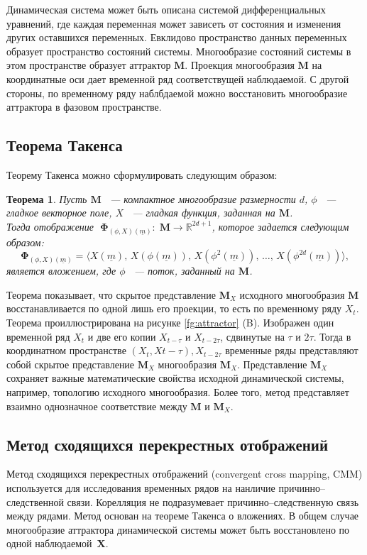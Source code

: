 \documentclass[12pt]{extarticle}
\newtheorem{theorem}{Теорема}
\newcommand{\bbr}{\mathbb{R}}
\begin{document}
Динамическая система может быть описана системой дифференциальных уравнений, где каждая переменная может зависеть от состояния и изменения других оставшихся переменных. Евклидово пространство данных переменных образует пространство состояний системы. Многообразие состояний системы в этом пространстве образует аттрактор $\mathbf{M}$. Проекция многообразия $\mathbf{M}$ на координатные оси дает временной ряд соответствущей наблюдаемой. С другой стороны, по временному ряду наблбдаемой можно восстановить многообразие аттрактора в фазовом пространстве.

\subsection{Теорема Такенса}
Теорему Такенса можно сформулировать следующим образом:
\begin{theorem}
Пусть $\mathbf{M}$ ~--- компактное многообразие размерности $d$, $\phi$ ~--- гладкое векторное поле, $X$ ~--- гладкая функция, заданная на $\mathbf{M}$.\\
Тогда отображение $\;\mathbf{\Phi}_{(\phi,X)(\underline{m})}:\; \mathbf{M} \rightarrow \bbr^{2d+1}$, которое задается следующим образом:
\[ \mathbf{\Phi}_{(\phi,X)(\underline{m})} = \langle X(\underline{m}),\,X(\phi(\underline{m})),\,X(\phi^2(\underline{m})),\,\dots,\, X(\phi^{2d}(\underline{m}))\rangle,\]
является вложением, где $\phi$ ~--- поток, заданный на $\mathbf{M}$.
\label{Taken's theorem}
\end{theorem}
Теорема показывает, что скрытое представление $\mathbf{M}_X$ исходного многообразия $\mathbf{M}$ восстанавливается по одной лишь его проекции, то есть по временному ряду $X_t$. Теорема проиллюстрирована на рисунке \ref{fg:attractor} (B). Изображен один временной ряд $X_t$ и две его копии $X_{t-\tau}$ и $X_{t-2\tau}$, сдвинутые на $\tau$ и $2\tau$. Тогда в координатном пространстве $(X_{t},X{t-\tau}),X_{t-2\tau}$ временные ряды представляют собой скрытое представление $\mathbf{M}_X$ многообразия $\mathbf{M}_X$. Представление $\mathbf{M}_X$ сохраняет важные математические свойства исходной динамической системы, например, топологию исходного многообразия. Более того, метод представляет взаимно однозначное соответствие между $\mathbf{M}$ и $\mathbf{M}_X$.


\subsection{Метод сходящихся перекрестных отображений}
Метод сходящихся перекрестных отображений (convergent cross mapping, CMM) используется для исследования временных рядов на нанличие причинно--следственной связи. Корелляция не подразумевает причинно--следственную связь между рядами. Метод основан на теореме Такенса о вложениях. В общем случае многообразие аттрактора динамической системы может быть восстановлено по одной наблюдаемой~$\mathbf{X}$.
\end{document}
